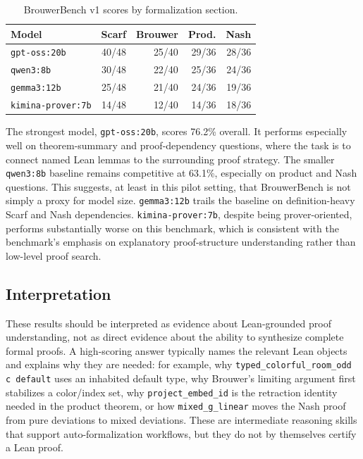 \documentclass{article}
\theoremstyle{definition}
\begin{document}
\begin{table}[H]
  \caption{BrouwerBench v1 scores by formalization section.}
  \label{tab:brouwerbench-v1-sections}
  \begin{center}
    \begin{scriptsize}
      \begin{tabular}{lrrrr}
        \toprule
        Model & Scarf & Brouwer & Prod. & Nash \\
        \midrule
        \texttt{gpt-oss:20b} & 40/48 & 25/40 & 29/36 & 28/36 \\
        \texttt{qwen3:8b} & 30/48 & 22/40 & 25/36 & 24/36 \\
        \texttt{gemma3:12b} & 25/48 & 21/40 & 24/36 & 19/36 \\
        \texttt{kimina-prover:7b} & 14/48 & 12/40 & 14/36 & 18/36 \\
        \bottomrule
      \end{tabular}
    \end{scriptsize}
  \end{center}
  \vskip -0.1in
\end{table}

The strongest model, \texttt{gpt-oss:20b}, scores 76.2\% overall. It performs especially well on theorem-summary and proof-dependency questions, where the task is to connect named Lean lemmas to the surrounding proof strategy. The smaller \texttt{qwen3:8b} baseline remains competitive at 63.1\%, especially on product and Nash questions. This suggests, at least in this pilot setting, that BrouwerBench is not simply a proxy for model size. \texttt{gemma3:12b} trails the baseline on definition-heavy Scarf and Nash dependencies. \texttt{kimina-prover:7b}, despite being prover-oriented, performs substantially worse on this benchmark, which is consistent with the benchmark's emphasis on explanatory proof-structure understanding rather than low-level proof search.

\subsection{Interpretation}

These results should be interpreted as evidence about Lean-grounded proof understanding, not as direct evidence about the ability to synthesize complete formal proofs. A high-scoring answer typically names the relevant Lean objects and explains why they are needed: for example, why \texttt{typed\_colorful\_room\_odd c default} uses an inhabited default type, why Brouwer's limiting argument first stabilizes a color/index set, why \texttt{project\_embed\_id} is the retraction identity needed in the product theorem, or how \texttt{mixed\_g\_linear} moves the Nash proof from pure deviations to mixed deviations. These are intermediate reasoning skills that support auto-formalization workflows, but they do not by themselves certify a Lean proof.
\end{document}

